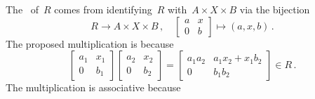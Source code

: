 \section{}





\subsection{}

The~{} of~$R$ comes from identifying~$R$ with~$A \times X \times B$ via the bijection
\[
          R
  \to     A \times X \times B \,,
  \quad   \begin{bmatrix}
            a & x \\
            0 & b
          \end{bmatrix}
  \mapsto (a,x,b) \,.
\]
The proposed multiplication is {\welldef} because
\[
  \begin{bmatrix}
    a_1 & x_1 \\
    0   & b_1
  \end{bmatrix}
  \begin{bmatrix}
    a_2 & x_2 \\
    0   & b_2
  \end{bmatrix}
  =
  \begin{bmatrix}
    a_1 a_2 & a_1 x_2 + x_1 b_2 \\
          0 & b_1 b_2
  \end{bmatrix}
  \in
  R \,.
\]
The multiplication is associative because
